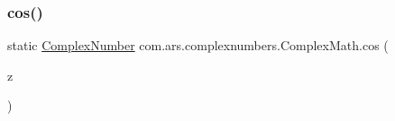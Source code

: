 \hypertarget{classcom_1_1ars_1_1complexnumbers_1_1_complex_math_a0ef9a0fc1769a14c5f81f89866643f19}{}\label{classcom_1_1ars_1_1complexnumbers_1_1_complex_math_a0ef9a0fc1769a14c5f81f89866643f19} 
\subsubsection{\texorpdfstring{cos()}{cos()}}
{\footnotesize\ttfamily static \hyperlink{classcom_1_1ars_1_1complexnumbers_1_1_complex_number}{Complex\+Number} com.\+ars.\+complexnumbers.\+Complex\+Math.\+cos (\begin{DoxyParamCaption}\item[{\hyperlink{classcom_1_1ars_1_1complexnumbers_1_1_complex_number}{Complex\+Number}}]{z }\end{DoxyParamCaption})\hspace{0.3cm}{\ttfamily [static]}}

